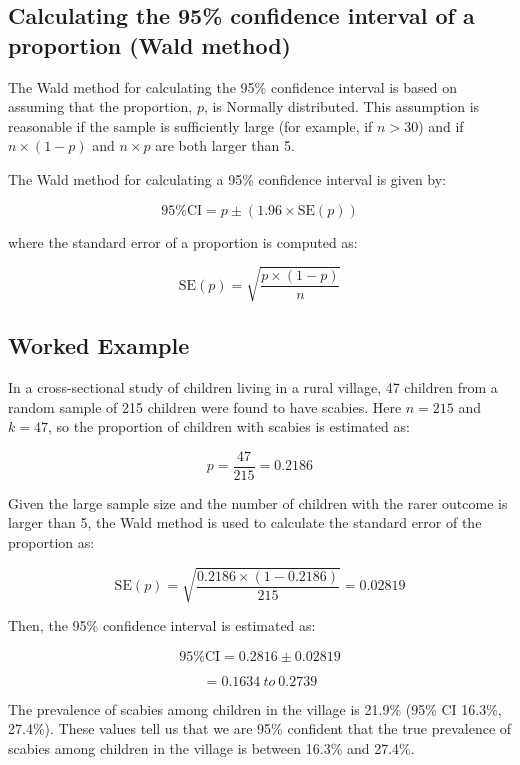 \documentclass[
]{memoir}
\begin{document}
\hypertarget{calculating-the-95-confidence-interval-of-a-proportion-wald-method}{%
\subsection{Calculating the 95\% confidence interval of a proportion (Wald method)}\label{calculating-the-95-confidence-interval-of-a-proportion-wald-method}}

The Wald method for calculating the 95\% confidence interval is based on assuming that the proportion, \(p\), is Normally distributed. This assumption is reasonable if the sample is sufficiently large (for example, if \(n>30\)) and if \(n \times (1-p)\) and \(n \times p\) are both larger than 5.

The Wald method for calculating a 95\% confidence interval is given by:

\[\text{95\% CI} = p \pm (1.96 \times \text{SE}(p))\]

where the standard error of a proportion is computed as:

\[\text{SE}(p) = \sqrt{\frac{p \times (1 - p)}{n}}\]

\hypertarget{worked-example-6}{%
\subsection{Worked Example}\label{worked-example-6}}

In a cross-sectional study of children living in a rural village, 47 children from a random sample of 215 children were found to have scabies. Here \(n=215\) and \(k=47\), so the proportion of children with scabies is estimated as:

\[ p = \frac{47}{215} = 0.2186 \]

Given the large sample size and the number of children with the rarer outcome is larger than 5, the Wald method is used to calculate the standard error of the proportion as:

\[{\text{SE}\left( p \right) = \sqrt{\frac{0.2186 \times (1 - 0.2186)}{215}}
}{= 0.02819}\]

Then, the 95\% confidence interval is estimated as:

\[\text{95\% CI} = 0.2816 \pm 0.02819\]

\[= 0.1634\ to\ 0.2739\]

The prevalence of scabies among children in the village is 21.9\% (95\% CI 16.3\%, 27.4\%). These values tell us that we are 95\% confident that the true prevalence of scabies among children in the village is between 16.3\% and 27.4\%.
\end{document}

